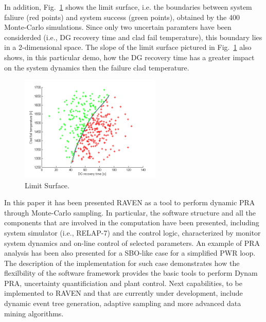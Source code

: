 \documentclass{mc2013}
\begin{document}
In addition, Fig.~\ref{fig:limit_surface_rng_temp_and_dg} shows the limit surface, i.e. the boundaries between system faliure (red points) and system success (green points), obtained by the 400 Monte-Carlo simulations. Since only two uncertain paramters have been considerded (i.e., DG recovery time and clad fail temperature), this boundary lies in a 2-dimensional space.
The slope of the limit surface pictured in Fig.~\ref{fig:limit_surface_rng_temp_and_dg} also shows, in this particular demo, how the DG recovery time has a greater impact on the system dynamics then the failure clad temperature.
\begin{figure}
   \centering
    \includegraphics[width=0.6\textwidth]{figures/PRA_limitSurface.png}
    \caption{Limit Surface.}
    \label{fig:limit_surface_rng_temp_and_dg}
\end{figure}
In this paper it has been presented RAVEN as a tool to perform dynamic PRA through Monte-Carlo sampling. In particular, the software structure and all the components that are involved in the computation have been presented, including system simulator (i.e., RELAP-7) and the control logic, characterized by monitor system dynamics and on-line control of selected parameters.
An example of PRA analysis has been also presented for a SBO-like case for a simplified PWR loop. 
The description of the implementation for such case demonstrates how the flexilbility of the software framework provides the basic tools to perform Dynam PRA, uncertainty quantificiation and plant control. 
Next capabilities, to be implemented to RAVEN and that are currently under development, include dynamic event tree generation, adaptive sampling and more advanced data mining algorithms. 



\end{document}
